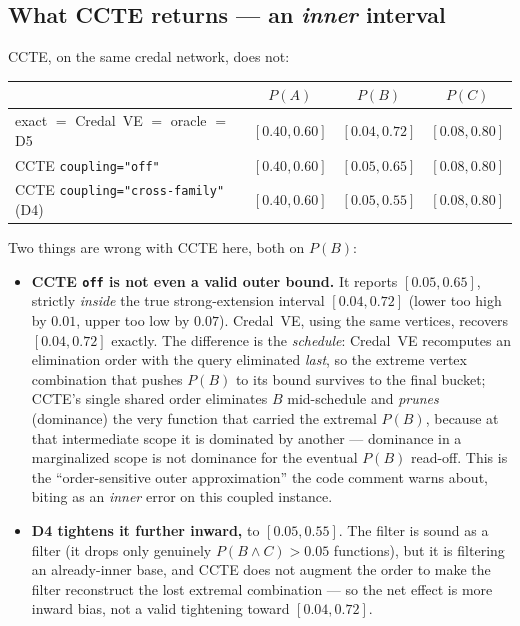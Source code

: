 \documentclass[11pt]{article}
\begin{document}
\subsection{What CCTE returns --- an \emph{inner} interval}
CCTE, on the same credal network, does not:
\begin{center}\small
\begin{tabular}{lccc}
\toprule
 & $P(A)$ & $P(B)$ & $P(C)$ \\
\midrule
exact $=$ Credal~VE $=$ oracle $=$ D5 & $[0.40,0.60]$ & $\mathbf{[0.04,0.72]}$ & $[0.08,0.80]$ \\
CCTE \texttt{coupling="off"}          & $[0.40,0.60]$ & $\mathbf{[0.05,0.65]}$ & $[0.08,0.80]$ \\
CCTE \texttt{coupling="cross-family"} (D4) & $[0.40,0.60]$ & $\mathbf{[0.05,0.55]}$ & $[0.08,0.80]$ \\
\bottomrule
\end{tabular}
\end{center}
Two things are wrong with CCTE here, both on $P(B)$:
\begin{itemize}
  \item \textbf{CCTE \texttt{off} is not even a valid outer bound.} It reports $[0.05,0.65]$,
    strictly \emph{inside} the true strong-extension interval $[0.04,0.72]$ (lower too high by
    $0.01$, upper too low by $0.07$). Credal~VE, using the same vertices, recovers $[0.04,0.72]$
    exactly. The difference is the \emph{schedule}: Credal~VE recomputes an elimination order
    with the query eliminated \emph{last}, so the extreme vertex combination that pushes $P(B)$ to
    its bound survives to the final bucket; CCTE's single shared order eliminates $B$ mid-schedule
    and \emph{prunes} (dominance) the very function that carried the extremal $P(B)$, because at
    that intermediate scope it is dominated by another --- dominance in a marginalized scope is
    not dominance for the eventual $P(B)$ read-off. This is the ``order-sensitive outer
    approximation'' the code comment warns about, biting as an \emph{inner} error on this
    coupled instance.
  \item \textbf{D4 tightens it further inward,} to $[0.05,0.55]$. The filter is sound as a filter
    (it drops only genuinely $P(B\land C)>0.05$ functions), but it is filtering an
    already-inner base, and CCTE does not augment the order to make the filter reconstruct the
    lost extremal combination --- so the net effect is more inward bias, not a valid tightening
    toward $[0.04,0.72]$.
\end{itemize}
\end{document}
